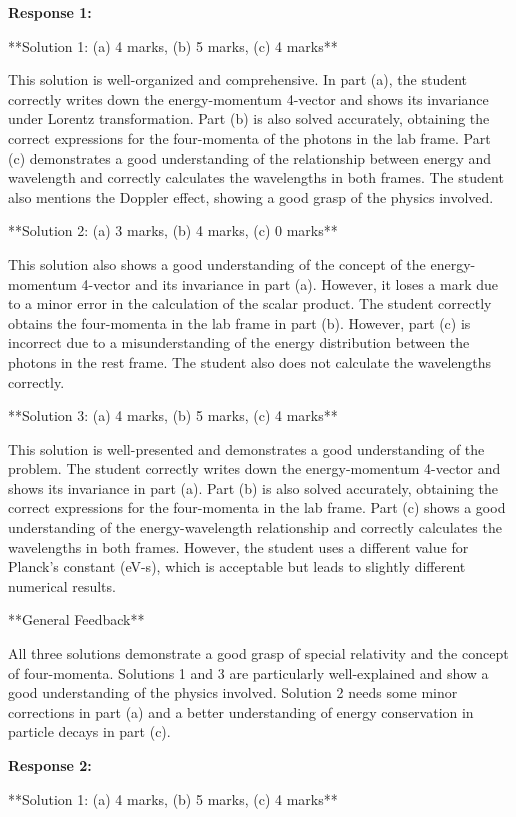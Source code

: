 \documentclass[a4paper,11pt]{article}
\begin{document}
\textbf{Response 1:}

**Solution 1: (a) 4 marks, (b) 5 marks, (c) 4 marks**

This solution is well-organized and comprehensive. In part (a), the student correctly writes down the energy-momentum 4-vector and shows its invariance under Lorentz transformation. Part (b) is also solved accurately, obtaining the correct expressions for the four-momenta of the photons in the lab frame. Part (c) demonstrates a good understanding of the relationship between energy and wavelength and correctly calculates the wavelengths in both frames. The student also mentions the Doppler effect, showing a good grasp of the physics involved.

**Solution 2: (a) 3 marks, (b) 4 marks, (c) 0 marks**

This solution also shows a good understanding of the concept of the energy-momentum 4-vector and its invariance in part (a). However, it loses a mark due to a minor error in the calculation of the scalar product. The student correctly obtains the four-momenta in the lab frame in part (b). However, part (c) is incorrect due to a misunderstanding of the energy distribution between the photons in the rest frame. The student also does not calculate the wavelengths correctly.

**Solution 3: (a) 4 marks, (b) 5 marks, (c) 4 marks**

This solution is well-presented and demonstrates a good understanding of the problem. The student correctly writes down the energy-momentum 4-vector and shows its invariance in part (a). Part (b) is also solved accurately, obtaining the correct expressions for the four-momenta in the lab frame. Part (c) shows a good understanding of the energy-wavelength relationship and correctly calculates the wavelengths in both frames. However, the student uses a different value for Planck's constant (eV-s), which is acceptable but leads to slightly different numerical results.

**General Feedback**

All three solutions demonstrate a good grasp of special relativity and the concept of four-momenta. Solutions 1 and 3 are particularly well-explained and show a good understanding of the physics involved. Solution 2 needs some minor corrections in part (a) and a better understanding of energy conservation in particle decays in part (c).

\bigskip    
\textbf{Response 2:}

**Solution 1: (a) 4 marks, (b) 5 marks, (c) 4 marks**
\end{document}
